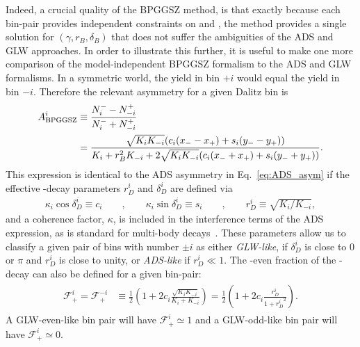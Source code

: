 Indeed, a crucial quality of the BPGGSZ method, is that exactly because each bin-pair provides independent constraints on \xpm and \ypm, the method provides a single solution for $(\gamma, r_B, \delta_B)$ that does not suffer the ambiguities of the ADS and GLW approaches. In order to illustrate this further, it is useful to make one more comparison of the model-independent BPGGSZ formalism to the ADS and GLW formalisms. In a \CP symmetric world, the \Bp yield in bin $+i$ would equal the \Bm yield in bin $-i$. Therefore the relevant \CP asymmetry for a given Dalitz bin is
\begin{align}
\begin{split}\label{eq:Ai_definition}
        A_\mathrm{BPGGSZ}^i &\equiv \frac{N^-_i - N^+_{-i}}{N^-_i + N^+_{-i}} \\
    &= \frac{\sqrt{K_i K_{-i}}(c_i(x_--x_+)+s_i(y_--y_+))}{K_i+r_B^2K_{-i} + 2 \sqrt{K_i K_{-i}}(c_i(x_-+x_+)+s_i(y_-+y_+))}.
\end{split}
\end{align}
This expression is identical to the ADS asymmetry in Eq.~\eqref{eq:ADS_asym} if the effective \D-decay parameters $r_D^i$ and $\delta_D^i$ are defined via
\begin{align}
    \kappa_i\cos\delta_D^i \equiv c_i \qquad, \qquad \kappa_i\sin \delta_D^i \equiv s_i \qquad, \qquad r_D^i \equiv \sqrt{K_i/K_{-i}},
\end{align}
and a coherence factor, $\kappa$, is included in the interference terms of the ADS expression, as is standard for multi-body \D decays~\cite{gronauImprovingBoundsGamma2003}. These parameters allow us to classify a given pair of bins with number $\pm i$ as either \emph{GLW-like}, if $ \delta_D^i$ is close to $0$ or $\pi$ and $r_D^i$  is close to unity, or \emph{ADS-like} if $r_D^i \ll 1$. The \CP-even fraction of the \D-decay can also be defined for a given bin-pair:
\begin{align}
\begin{split}
    \mathcal F_{+}^i = \mathcal F_+^{-i} &\equiv \frac{1}{2}\left(1 + 2c_i \frac{\sqrt{K_i K_{-i}}}{K_i + K_{-i}}\right) = \frac{1}{2}\left(1 + 2c_i \frac{r_D^i}{1+{r_D^i}^2}\right).
\end{split}
\end{align}
A GLW-even-like bin pair will have $\mathcal F_{+}^i\simeq 1$ and a GLW-odd-like bin pair will have $\mathcal F_{+}^i\simeq 0$.

